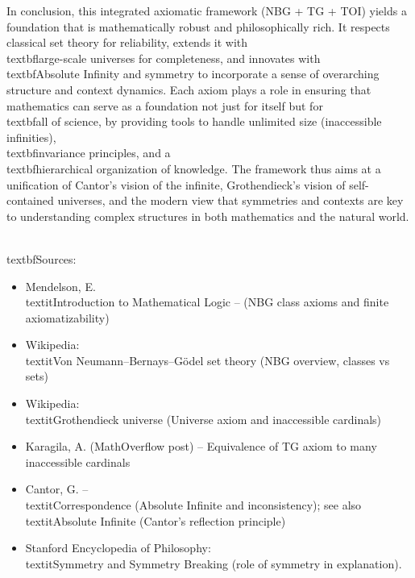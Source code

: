 \documentclass[11pt]{article}
\begin{document}
In conclusion, this integrated axiomatic framework (NBG + TG + TOI) yields a foundation that is mathematically robust and philosophically rich. It respects classical set theory for reliability, extends it with \\textbf{large-scale universes} for completeness, and innovates with \\textbf{Absolute Infinity and symmetry} to incorporate a sense of overarching structure and context dynamics. Each axiom plays a role in ensuring that mathematics can serve as a foundation not just for itself but for \\textbf{all of science}, by providing tools to handle unlimited size (inaccessible infinities), \\textbf{invariance principles}, and a \\textbf{hierarchical organization of knowledge}. The framework thus aims at a unification of Cantor’s vision of the infinite, Grothendieck’s vision of self-contained universes, and the modern view that symmetries and contexts are key to understanding complex structures in both mathematics and the natural world.

\\textbf{Sources:}

\begin{itemize}
  \item Mendelson, E. \\textit{Introduction to Mathematical Logic} – (NBG class axioms and finite axiomatizability)
  \item Wikipedia: \\textit{Von Neumann–Bernays–Gödel set theory} (NBG overview, classes vs sets)
  \item Wikipedia: \\textit{Grothendieck universe} (Universe axiom and inaccessible cardinals)
  \item Karagila, A. (MathOverflow post) – Equivalence of TG axiom to many inaccessible cardinals
  \item Cantor, G. – \\textit{Correspondence} (Absolute Infinite and inconsistency); see also \\textit{Absolute Infinite} (Cantor’s reflection principle)
  \item Stanford Encyclopedia of Philosophy: \\textit{Symmetry and Symmetry Breaking} (role of symmetry in explanation).
\end{itemize}
\end{document}
